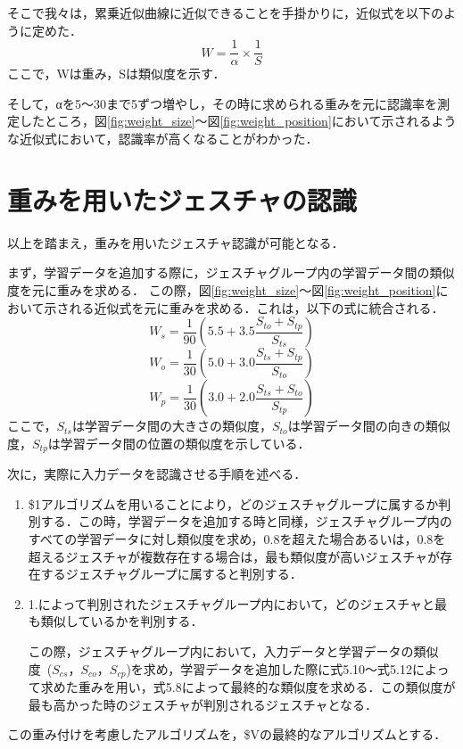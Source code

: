 そこで我々は，累乗近似曲線に近似できることを手掛かりに，近似式を以下のように定めた．\begin{equation}
W = \frac{1}{α} \times \frac{1}{S} 
\end{equation}
ここで，Wは重み，Sは類似度を示す．

そして，αを5〜30まで5ずつ増やし，その時に求められる重みを元に認識率を測定したところ，図\ref{fig:weight_size}〜図\ref{fig:weight_position}において示されるような近似式において，認識率が高くなることがわかった．

\clearpage
\section{重みを用いたジェスチャの認識}
以上を踏まえ，重みを用いたジェスチャ認識が可能となる．

まず，学習データを追加する際に，ジェスチャグループ内の学習データ間の類似度を元に重みを求める．
この際，図\ref{fig:weight_size}〜図\ref{fig:weight_position}において示される近似式を元に重みを求める．これは，以下の式に統合される．
\begin{equation}
W_\textit{s} = \frac{1}{90}(5.5 + 3.5\frac{S_\textit{to} + S_\textit{tp}}{S_\textit{ts}})
\end{equation}
\begin{equation}
W_\textit{o} = \frac{1}{30}(5.0 + 3.0\frac{S_\textit{ts} + S_\textit{tp}}{S_\textit{to}})
\end{equation}
\begin{equation}
W_\textit{p} = \frac{1}{30}(3.0 + 2.0\frac{S_\textit{ts} + S_\textit{to}}{S_\textit{tp}})
\end{equation}
ここで，$S_\textit{ts}$は学習データ間の大きさの類似度，$S_\textit{to}$は学習データ間の向きの類似度，$S_\textit{tp}$は学習データ間の位置の類似度を示している．


次に，実際に入力データを認識させる手順を述べる．
\begin{enumerate}
\item \$1アルゴリズムを用いることにより，どのジェスチャグループに属するか判別する．この時，学習データを追加する時と同様，ジェスチャグループ内のすべての学習データに対し類似度を求め，0.8を超えた場合あるいは，0.8を超えるジェスチャが複数存在する場合は，最も類似度が高いジェスチャが存在するジェスチャグループに属すると判別する．
\item 1.によって判別されたジェスチャグループ内において，どのジェスチャと最も類似しているかを判別する．

この際，ジェスチャグループ内において，入力データと学習データの類似度~($S_\textit{cs}$，$S_\textit{co}$，$S_\textit{cp}$)を求め，学習データを追加した際に式5.10〜式5.12によって求めた重みを用い，式5.8によって最終的な類似度を求める．この類似度が最も高かった時のジェスチャが判別されるジェスチャとなる．

\end{enumerate}

この重み付けを考慮したアルゴリズムを，\$Vの最終的なアルゴリズムとする．







